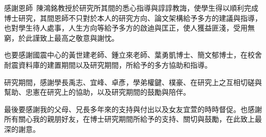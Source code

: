 感謝恩師\ 陳鴻銘教授於研究所其間的悉心指導與諄諄教誨，使學生得以順利完成博士研究，其間恩師不只對於本人的研究方向、論文架構給予多方的建議與指導，也對學生待人處事，人生方向等給予多方的啟迪與匡正，使人獲益匪淺，受用無窮，於此謹致上最高之敬意與謝忱。

也要感謝國震中心的黃世建老師、鍾立來老師、葉勇凱博士、簡文郁博士，在校舍耐震資料庫的建置期間以及研究期間，所給予的多方協助和指導。

研究期間，感謝學長禹志、宜峰、卓彥，學弟權鍵、樸豪、在研究上之互相切磋與幫助、忠憲在研究上的協助，以及研究期間的鼓勵與陪伴。

最後要感謝我的父母、兄長多年來的支持與付出以及女友宜萱的時時督促。也感謝所有關心我的親朋好友，在博士研究期間所給予的支持、關切與鼓勵，在此致上最深的謝意。



